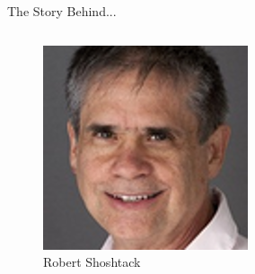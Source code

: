 \documentclass{beamer}
\begin{document}
\begin{frame}{The Story Behind...}
    \begin{columns} %
        \begin{column}{0.5\textwidth} %
            \begin{figure}
                \centering
                \includegraphics[width=\linewidth]{image/RobertShoshtack.png}
                \caption{Robert Shoshtack}
            \end{figure}
        \end{column}
        \begin{column}{0.5\textwidth} %
           \begin{tikzpicture} %

\end{tikzpicture}
\end{column}
\end{columns}
\end{frame}
\end{document}
